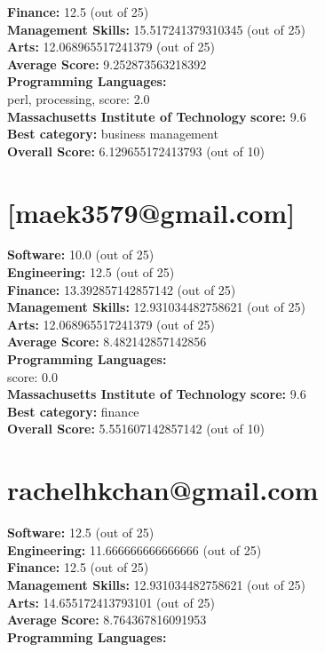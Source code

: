 \documentclass{article}
\begin{document}
\textbf{Finance:} 12.5 (out of 25)\\
\textbf{Management Skills:} 15.517241379310345 (out of 25)\\
\textbf{Arts:} 12.068965517241379 (out of 25)\\
\textbf{Average Score: } 9.252873563218392\\
\textbf{Programming Languages:} \\
perl, processing, score: 2.0\\
\textbf{Massachusetts Institute of Technology} \textbf{score:} 9.6\\
\textbf{Best category: } business management\\
\textbf{Overall Score: }6.129655172413793 (out of 10)\section{[maek3579@gmail.com]}
\textbf{Software:} 10.0 (out of 25)\\
\textbf{Engineering: } 12.5 (out of 25)\\
\textbf{Finance:} 13.392857142857142 (out of 25)\\
\textbf{Management Skills:} 12.931034482758621 (out of 25)\\
\textbf{Arts:} 12.068965517241379 (out of 25)\\
\textbf{Average Score: } 8.482142857142856\\
\textbf{Programming Languages:} \\
score: 0.0\\
\textbf{Massachusetts Institute of Technology} \textbf{score:} 9.6\\
\textbf{Best category: } finance\\
\textbf{Overall Score: }5.551607142857142 (out of 10)\section{rachelhkchan@gmail.com}
\textbf{Software:} 12.5 (out of 25)\\
\textbf{Engineering: } 11.666666666666666 (out of 25)\\
\textbf{Finance:} 12.5 (out of 25)\\
\textbf{Management Skills:} 12.931034482758621 (out of 25)\\
\textbf{Arts:} 14.655172413793101 (out of 25)\\
\textbf{Average Score: } 8.764367816091953\\
\textbf{Programming Languages:} \\
\end{document}
